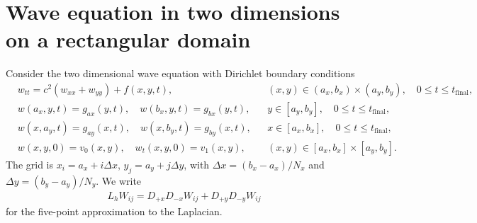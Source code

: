 \documentclass[11pt]{article}
\begin{document}
\section{Wave equation in two dimensions on a rectangular domain}
Consider the two dimensional wave equation with Dirichlet boundary conditions
\begin{subequations}
\label{eq:2DWaveEquation}
\begin{align}
  &w_{tt} = c^2 \left(w_{xx}+w_{yy}\right) + f(x,y,t), && (x,y) \in (a_x,b_x)\times(a_y,b_y), \quad 0 \leq t \leq t_{\text{final}}, \\
  &w(a_x,y,t) = g_{ax}(y,t), \quad w(b_x,y,t) = g_{bx}(y,t), && y \in [a_y,b_y], \quad 0 \leq t \leq t_{\text{final}}, \\
  &w(x,a_y,t) = g_{ay}(x,t), \quad w(x,b_y,t) = g_{by}(x,t), && x \in [a_x,b_x], \quad 0 \leq t \leq t_{\text{final}}, \\
  &w(x,y,0) = v_0(x,y), \quad w_t(x,y,0) = v_1(x,y), && (x,y) \in [a_x,b_x]\times[a_y,b_y].
\end{align}
\end{subequations}
The grid is $x_i = a_x + i\Delta x$, $y_j = a_y + j\Delta y$, with $\Delta x = (b_x-a_x)/N_x$ and $\Delta y = (b_y-a_y)/N_y$. We write
\begin{align}
L_h W_{ij} = D_{+x}D_{-x}W_{ij} + D_{+y}D_{-y}W_{ij}
\end{align}
for the five-point approximation to the Laplacian.
\end{document}
